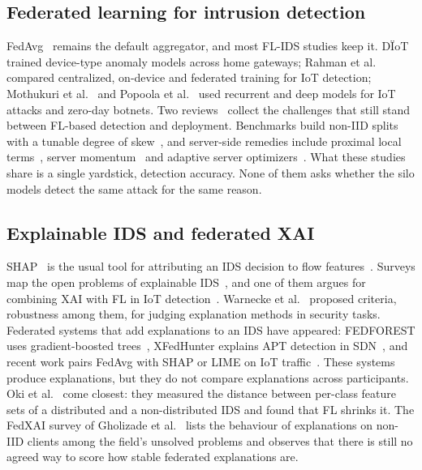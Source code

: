 \documentclass[conference]{IEEEtran}
\begin{document}
\subsection{Federated learning for intrusion detection}
FedAvg~\cite{mcmahan2017} remains the default aggregator, and most FL-IDS studies keep
it. D\"IoT~\cite{nguyen2019diot} trained device-type anomaly models across home
gateways; Rahman et al.~\cite{rahman2020} compared centralized, on-device and federated
training for IoT detection; Mothukuri et al.~\cite{mothukuri2022} and Popoola et
al.~\cite{popoola2022} used recurrent and deep models for IoT attacks and zero-day
botnets. Two reviews~\cite{campos2022,agrawal2022} collect the challenges that still
stand between FL-based detection and deployment. Benchmarks build non-IID splits with a
tunable degree of skew~\cite{hsu2019,li2022noniid}, and server-side remedies include proximal local
terms~\cite{li2020fedprox}, server momentum~\cite{hsu2019} and adaptive server
optimizers~\cite{reddi2021}. What these studies share is a single yardstick, detection
accuracy. None of them asks whether the silo models detect the same attack for the same
reason.

\subsection{Explainable IDS and federated XAI}
SHAP~\cite{lundberg2017} is the usual tool for attributing an IDS decision to flow
features~\cite{wang2020xai}. Surveys map the open problems of explainable
IDS~\cite{neupane2022}, and one of them argues for combining XAI with FL in IoT
detection~\cite{arisdakessian2023}. Warnecke et al.~\cite{warnecke2020} proposed
criteria, robustness among them, for judging explanation methods in security tasks. Federated systems that add explanations to an IDS have
appeared: FEDFOREST uses gradient-boosted trees~\cite{dong2022fedforest},
XFedHunter explains APT detection in SDN~\cite{thi2023xfedhunter}, and recent work
pairs FedAvg with SHAP or LIME on IoT traffic~\cite{bilal2025,gholamrezazadeh2026}.
These systems produce explanations, but they do not compare explanations across
participants. Oki et al.~\cite{oki2024} come closest: they measured the distance between
per-class feature sets of a distributed and a non-distributed IDS and found that FL
shrinks it. The FedXAI survey of Gholizade et al.~\cite{gholizade2026} lists the
behaviour of explanations on non-IID clients among the field's unsolved problems and
observes that there is still no agreed way to score how stable federated explanations
are.
\end{document}
